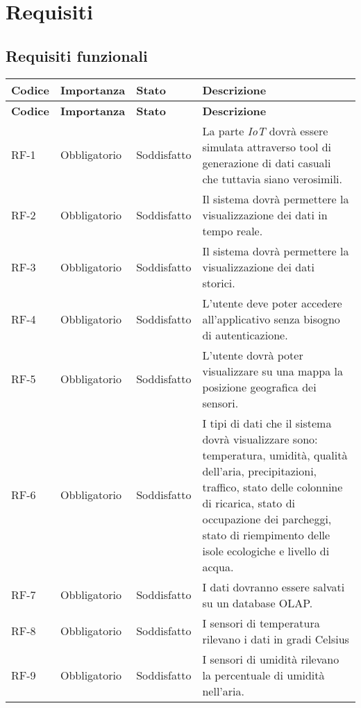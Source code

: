 
\section{Requisiti}
\subsection{Requisiti funzionali}
\begin{longtable}{|>{\centering\arraybackslash}m{}|>{\centering\arraybackslash}m{}|>{\centering\arraybackslash}m{}|>{\centering\arraybackslash}m{}|}
	\hline
	\textbf{Codice} & \textbf{Importanza} & \textbf{Stato}& \textbf{Descrizione}\\\hline
	\endfirsthead
	\hline
	\textbf{Codice} & \textbf{Importanza} & \textbf{Stato}& \textbf{Descrizione}\\\hline
	\endhead
	\hline
	RF-1            & Obbligatorio        & Soddisfatto & La parte \textit{IoT} dovrà essere simulata attraverso tool di generazione di dati casuali che tuttavia siano verosimili.
	\\\hline
	RF-2            & Obbligatorio        & Soddisfatto & Il sistema dovrà permettere la visualizzazione dei dati in tempo reale.
	\\\hline
	RF-3            & Obbligatorio        & Soddisfatto & Il sistema dovrà permettere la visualizzazione dei dati storici.
	\\\hline
	RF-4            & Obbligatorio        & Soddisfatto & L'utente deve poter accedere all'applicativo senza bisogno di autenticazione.
	\\\hline
	RF-5            & Obbligatorio        & Soddisfatto & L'utente dovrà poter visualizzare su una mappa la posizione geografica dei sensori.
	\\\hline
	RF-6            & Obbligatorio        & Soddisfatto & I tipi di dati che il sistema dovrà visualizzare sono: temperatura, umidità, qualità dell'aria, precipitazioni, traffico, stato delle colonnine di ricarica, stato di occupazione dei parcheggi, stato di riempimento delle isole ecologiche e livello di acqua.
	\\\hline
	RF-7            & Obbligatorio        & Soddisfatto & I dati dovranno essere salvati su un database OLAP.
	\\\hline
	RF-8            & Obbligatorio        & Soddisfatto & I sensori di temperatura rilevano i dati in gradi Celsius
	\\\hline
	RF-9            & Obbligatorio        & Soddisfatto & I sensori di umidità rilevano la percentuale di umidità nell’aria.

\end{longtable}
